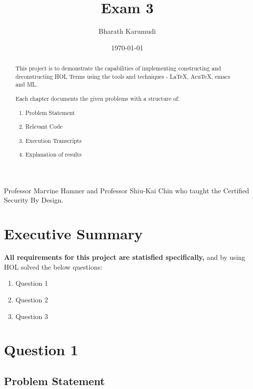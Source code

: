 \documentclass{report}
\title{Exam 3}
\author{Bharath Karumudi}
\date{\today}
\begin{document}
 \lstset{language=ML}
 \maketitle{}

 \begin{abstract}
   This project is to demonstrate the capabilities of implementing
   constructing and deconstructing HOL Terms using the tools and
   techniques - \LaTeX{}, AcuTeX, emacs and ML. 

   Each chapter documents the given problems with a structure of:
   \begin{enumerate}
   \item Problem Statement
   \item Relevant Code
   \item Execution Transcripts
   \item Explanation of results
   \end{enumerate}

 \end{abstract}


 \begin{acknowledgments}
  Professor Marvine Hamner and Professor Shiu-Kai Chin who taught the
  Certified Security By Design.
 \end{acknowledgments}

 \tableofcontents{}

 \chapter{Executive Summary}
 \label{cha:executive-summary}

\textbf{All requirements for this project are statisfied specifically,}
 and by using HOL solved the below questions: 

   \begin{enumerate}
   \item Question 1
   \item Question 2
   \item Question 3
   \end{enumerate}  




 \chapter{Question 1}
 \label{cha:ques1}
  
 \section{Problem Statement}
 \label{sec:problem-statement-1}
\end{document}
